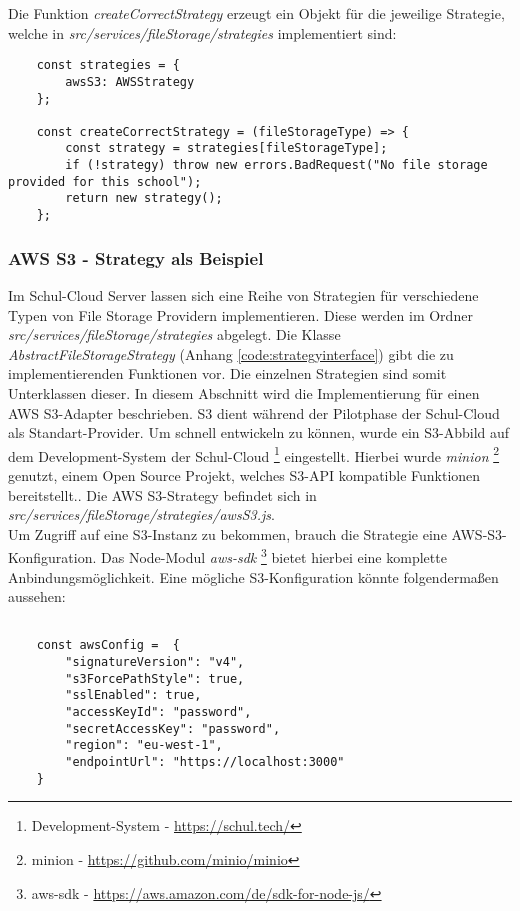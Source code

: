 Die Funktion \textit{createCorrectStrategy} erzeugt ein Objekt für die jeweilige Strategie, welche in \textit{src/services/fileStorage/strategies} implementiert sind:

\begin{lstlisting}
	const strategies = {
		awsS3: AWSStrategy
	};

	const createCorrectStrategy = (fileStorageType) => {
		const strategy = strategies[fileStorageType];
		if (!strategy) throw new errors.BadRequest("No file storage provided for this school");
		return new strategy();
	};
\end{lstlisting}

\subsubsection{AWS S3 - Strategy als Beispiel}
\label{sec:awss3impl}

Im Schul-Cloud Server lassen sich eine Reihe von Strategien für verschiedene Typen von File Storage Providern implementieren. Diese werden im Ordner \textit{src/services/fileStorage/strategies} abgelegt. Die Klasse \textit{AbstractFileStorageStrategy} (Anhang \ref{code:strategyinterface}) gibt die zu implementierenden Funktionen vor. Die einzelnen Strategien sind somit Unterklassen dieser. In diesem Abschnitt wird die Implementierung für einen AWS S3-Adapter beschrieben. S3 dient während der Pilotphase der Schul-Cloud als Standart-Provider. Um schnell entwickeln zu können, wurde ein S3-Abbild auf dem Development-System der Schul-Cloud \footnote{Development-System - \url{https://schul.tech/}} eingestellt. Hierbei wurde \textit{minion} \footnote{minion - \url{https://github.com/minio/minio}} genutzt, einem Open Source Projekt, welches S3-API kompatible Funktionen bereitstellt.. Die AWS S3-Strategy befindet sich in \textit{src/services/fileStorage/strategies/awsS3.js}. \\

Um Zugriff auf eine S3-Instanz zu bekommen, brauch die Strategie eine AWS-S3-Konfiguration. Das Node-Modul \textit{aws-sdk} \footnote{aws-sdk - \url{https://aws.amazon.com/de/sdk-for-node-js/}} bietet hierbei eine komplette Anbindungsmöglichkeit. Eine mögliche S3-Konfiguration könnte folgendermaßen aussehen:

\begin{lstlisting}
	
	const awsConfig =  {
		"signatureVersion": "v4",
		"s3ForcePathStyle": true,
		"sslEnabled": true,
		"accessKeyId": "password",
		"secretAccessKey": "password",
		"region": "eu-west-1",
		"endpointUrl": "https://localhost:3000"
	}
\end{lstlisting}

